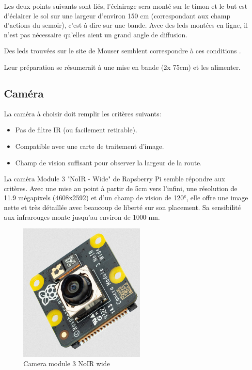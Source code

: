 Les deux points suivants sont liés, l'éclairage sera monté sur le timon et le but est d'éclairer le sol sur une largeur d'environ 150 \si{\centi\metre} (correspondant aux champ d'actions du semoir),
c'est à dire sur une bande. Avec des leds montées en ligne, il n'est pas nécessaire qu'elles aient un grand angle de diffusion.

Des leds trouvées sur le site de Mouser semblent correspondre à ces conditions \cite{ledIR}.

Leur préparation se résumerait à une mise en bande (2x 75\si{\centi\metre}) et les alimenter.


\subsection{Caméra}
La caméra à choisir doit remplir les critères suivants:
\begin{itemize}
    \item Pas de filtre IR (ou facilement retirable).
    \item Compatible avec une carte de traitement d'image.
    \item Champ de vision suffisant pour observer la largeur de la route.
\end{itemize}

La caméra Module 3 "NoIR - Wide" de Rapsberry Pi \cite{camera} semble répondre aux critères. Avec une mise au point à partir de 5cm vers l'infini,
une résolution de 11.9 mégapixels (4608x2592) et d'un champ de vision de \ang{120}, elle offre une image nette et très détaillée avec beaucoup de liberté sur
son placement. Sa sensibilité aux infrarouges monte jusqu'au environ de 1000 \si{\nano\metre}.
\begin{figure}[H]
    \centering
    \includegraphics[height=7cm,angle=-90]{assets/figures/camera.png}
    \caption{Camera module 3 NoIR wide}
\end{figure}
\newpage
